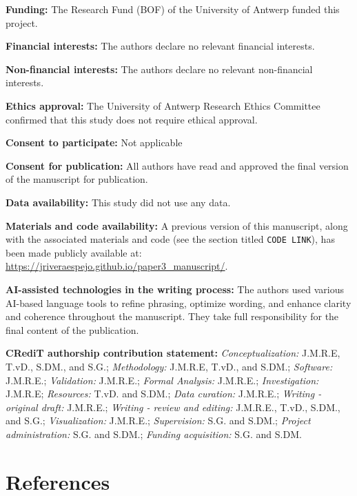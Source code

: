 \documentclass[
  authoryear,
  review,
  1p]{elsarticle}
\begin{document}
\textbf{Funding:} The Research Fund (BOF) of the University of Antwerp
funded this project.

\textbf{Financial interests:} The authors declare no relevant financial
interests.

\textbf{Non-financial interests:} The authors declare no relevant
non-financial interests.

\textbf{Ethics approval:} The University of Antwerp Research Ethics
Committee confirmed that this study does not require ethical approval.

\textbf{Consent to participate:} Not applicable

\textbf{Consent for publication:} All authors have read and approved the
final version of the manuscript for publication.

\textbf{Data availability:} This study did not use any data.

\textbf{Materials and code availability:} A previous version of this
manuscript, along with the associated materials and code (see the
section titled \texttt{CODE\ LINK}), has been made publicly available
at: \url{https://jriveraespejo.github.io/paper3_manuscript/}.

\textbf{AI-assisted technologies in the writing process:} The authors
used various AI-based language tools to refine phrasing, optimize
wording, and enhance clarity and coherence throughout the manuscript.
They take full responsibility for the final content of the publication.

\textbf{CRediT authorship contribution statement:}
\emph{Conceptualization:} J.M.R.E, T.vD., S.DM., and S.G.;
\emph{Methodology:} J.M.R.E, T.vD., and S.DM.; \emph{Software:}
J.M.R.E.; \emph{Validation:} J.M.R.E.; \emph{Formal Analysis:} J.M.R.E.;
\emph{Investigation:} J.M.R.E; \emph{Resources:} T.vD. and S.DM.;
\emph{Data curation:} J.M.R.E.; \emph{Writing - original draft:}
J.M.R.E.; \emph{Writing - review and editing:} J.M.R.E., T.vD., S.DM.,
and S.G.; \emph{Visualization:} J.M.R.E.; \emph{Supervision:} S.G. and
S.DM.; \emph{Project administration:} S.G. and S.DM.; \emph{Funding
acquisition:} S.G. and S.DM.

\newpage{}

\newpage{}

\section*{References}\label{references}

\renewcommand{\bibsection}{}

\end{document}
